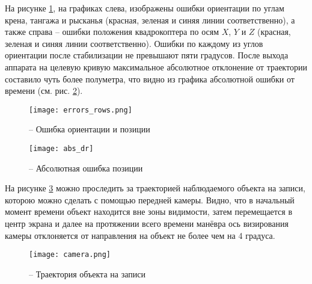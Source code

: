 \begin{comment}
На рисунках \ref{fig:mau_eul} представлены углы ориентации квадрокоптера во время движения.
\begin{figure}[h!]

\subfloat[Крен]{%
\texttt{[image: roll]}%
}

\subfloat[Тангаж]{%
\texttt{[image: pitch]}%
}

\subfloat[Рысканье]{%
\texttt{[image: yaw]}%
}
\caption{ -- Углы ориентации}
\label{fig:mau_eul}

\end{figure} 
\end{comment}

На рисунке \ref{fig:mau_errors}, на графиках слева, изображены ошибки ориентации по углам крена, тангажа и рысканья (красная, зеленая и синяя линии соответственно), а также справа -- ошибки положения  квадрокоптера по осям $X$, $Y$ и $Z$ (красная, зеленая и синяя линии соответственно).
Ошибки по каждому из углов ориентации после стабилизации не превышают пяти градусов.
После выхода аппарата на целевую кривую максимальное абсолютное отклонение от траектории составило чуть более полуметра, что видно из графика абсолютной ошибки от времени (см. рис. \ref{fig:mau_abs_dr}).
\begin{figure}[h!]
	\centering
	\texttt{[image: errors\_rows.png]}
	\caption{ -- Ошибка ориентации и позиции}
	\label{fig:mau_errors}
\end{figure}

\begin{figure}[h!]
	\centering
	\texttt{[image: abs\_dr]}
	\caption{ -- Абсолютная ошибка позиции}
	\label{fig:mau_abs_dr}
\end{figure}

На рисунке \ref{fig:mau_cam} можно проследить за траекторией наблюдаемого объекта на записи, которою можно сделать с помощью передней камеры.
Видно, что в начальный момент времени объект находится вне зоны видимости, затем перемещается в центр экрана и далее на протяжении всего времени манёвра ось визирования камеры отклоняется от направления на объект не более чем на 4 градуса.
\begin{figure}[h!]
	\centering
	\texttt{[image: camera.png]}
	\caption{ -- Траектория объекта на записи}
	\label{fig:mau_cam}
\end{figure}

